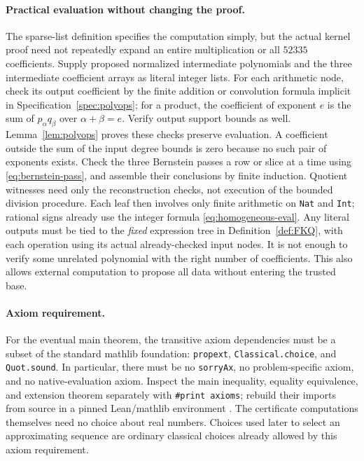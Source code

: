 \documentclass[11pt,a4paper]{article}
\theoremstyle{definition}
\newcommand{\lean}[1]{{\small\nolinkurl{#1}}}
\begin{document}
\paragraph{Practical evaluation without changing the proof.}
The sparse-list definition specifies the computation simply, but the actual kernel proof need not repeatedly expand an entire multiplication or all $52335$ coefficients. Supply proposed normalized intermediate polynomials and the three intermediate coefficient arrays as literal integer lists. For each arithmetic node, check its output coefficient by the finite addition or convolution formula implicit in Specification~\ref{spec:polyops}; for a product, the coefficient of exponent $e$ is the sum of $p_\alpha q_\beta$ over $\alpha+\beta=e$. Verify output support bounds as well. Lemma~\ref{lem:polyops} proves these checks preserve evaluation. A coefficient outside the sum of the input degree bounds is zero because no such pair of exponents exists.
Check the three Bernstein passes a row or slice at a time using \eqref{eq:bernstein-pass}, and assemble their conclusions by finite induction. Quotient witnesses need only the reconstruction checks, not execution of the bounded division procedure. Each leaf then involves only finite arithmetic on \lean{Nat} and \lean{Int}; rational signs already use the integer formula \eqref{eq:homogeneous-eval}.
Any literal outputs must be tied to the \emph{fixed} expression tree in Definition~\ref{def:FKQ}, with each operation using its actual already-checked input nodes. It is not enough to verify some unrelated polynomial with the right number of coefficients. This also allows external computation to propose all data without entering the trusted base.

\paragraph{Axiom requirement.}
For the eventual main theorem, the transitive axiom dependencies must be a subset of the standard mathlib foundation: \lean{propext}, \lean{Classical.choice}, and \lean{Quot.sound}. In particular, there must be no \lean{sorryAx}, no problem-specific axiom, and no native-evaluation axiom. Inspect the main inequality, equality equivalence, and extension theorem separately with \texttt{\#print axioms}; rebuild their imports from source in a pinned Lean/mathlib environment \cite{lean-axioms,lean-validation}. The certificate computations themselves need no choice about real numbers. Choices used later to select an approximating sequence are ordinary classical choices already allowed by this axiom requirement.
\end{document}
